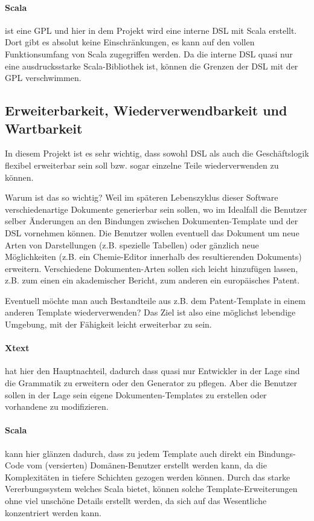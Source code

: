 \paragraph{Scala} ist eine GPL und hier in dem Projekt wird eine interne
DSL mit Scala erstellt. Dort gibt es absolut keine Einschränkungen, es
kann auf den vollen Funktionsumfang von Scala zugegriffen werden.
Da die interne DSL quasi nur eine ausdrucksstarke Scala-Bibliothek ist,
können die Grenzen der DSL mit der GPL verschwimmen.


\subsection{Erweiterbarkeit, Wiederverwendbarkeit und Wartbarkeit}
\label{sec-erweiterbar}

In diesem Projekt ist es sehr wichtig, dass sowohl DSL als auch
die Geschäftslogik flexibel erweiterbar sein soll bzw. sogar
einzelne Teile wiederverwenden zu können.

Warum ist das so wichtig? Weil im späteren Lebenszyklus dieser Software
verschiedenartige Dokumente generierbar sein sollen, wo im Idealfall
die Benutzer selber Änderungen an den Bindungen zwischen
Dokumenten-Template und der DSL vornehmen können. Die Benutzer
wollen eventuell das Dokument um neue Arten von Darstellungen (z.B. spezielle
Tabellen) oder gänzlich neue Möglichkeiten (z.B. ein Chemie-Editor
innerhalb des resultierenden Dokuments) erweitern.
Verschiedene Dokumenten-Arten sollen sich leicht hinzufügen lassen,
z.B. zum einen ein akademischer Bericht, zum anderen ein europäisches Patent.

Eventuell möchte man auch Bestandteile aus z.B. dem Patent-Template in
einem anderen Template wiederverwenden? Das Ziel ist also eine
möglichst lebendige Umgebung, mit der Fähigkeit leicht erweiterbar zu sein.

\paragraph{Xtext} hat hier den Hauptnachteil, dadurch dass quasi nur
Entwickler in der Lage sind die Grammatik zu erweitern oder den
Generator zu pflegen. Aber die Benutzer sollen in der Lage sein
eigene Dokumenten-Templates zu erstellen oder vorhandene zu modifizieren.

\paragraph{Scala} kann hier glänzen dadurch, dass zu jedem Template auch
direkt ein Bindungs-Code vom (versierten) Domänen-Benutzer erstellt
werden kann, da die Komplexitäten in tiefere Schichten gezogen werden können.
Durch das starke Vererbungssystem welches Scala bietet, können solche
Template-Erweiterungen ohne viel unschöne Details erstellt werden, da sich
auf das Wesentliche konzentriert werden kann.


